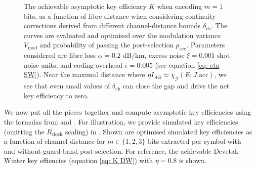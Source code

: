 ﻿\documentclass[12pt]{article}
\begin{document}
\begin{figure}[t]
  \caption{The achievable asymptotic key efficiency $K$ when encoding $m=1$ bits, as a function of fibre distance when considering continuity corrections derived from different channel-distance bounds $\delta_{\mathrm{ch}}$. The curves are evaluated and optimised over the modulation variance $V_\text{mod}$ and probability of passing the post-selection $p_\text{acc}$. Parameters considered are fibre loss $\alpha = 0.2$ dB/km, excess noise $\xi = 0.001$ shot noise units, and coding overhead $\epsilon = 0.005$ (see equation \eqref{eq: eta SW}). Near the maximal distance where $\eta I_{AB} \approx \chi_\mathcal{G}(E;J|\text{acc})$, we see that even small values of $\delta_{\mathrm{ch}}$ can close the gap and drive the net key efficiency to zero. }
  \label{fig:key-per-pulse-delta-ch}
\end{figure}

We now put all the pieces together and compute asymptotic key efficiencies using the formulas from  and . For illustration, we provide simulated key efficiencies (omitting the $R_\text{clock}$ scaling) in . Shown are optimised simulated key efficiencies as a function of channel distance for $m \in \{1,2,3\}$ bits extracted per symbol with and without guard-band post-selection. For reference, the achievable Devetak-Winter key effiencies (equation \eqref{eq: K DW}) with $\eta = 0.8$ is shown.
\end{document}

